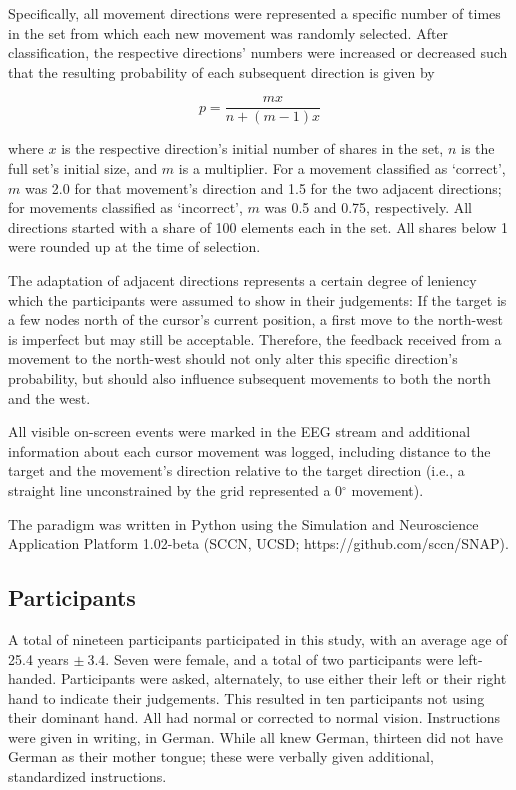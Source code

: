 Specifically, all movement directions were represented a specific number of times in the set from which each new movement was randomly selected. After classification, the respective directions' numbers were increased or decreased such that the resulting probability of each subsequent direction is given by

\begin{displaymath}
    p=\frac{mx}{n+(m-1)x}
\end{displaymath}

\noindent where $x$ is the respective direction's initial number of shares in the set, $n$ is the full set's initial size, and $m$ is a multiplier. For a movement classified as `correct', $m$ was 2.0 for that movement's direction and 1.5 for the two adjacent directions; for movements classified as `incorrect', $m$ was 0.5 and 0.75, respectively. All directions started with a share of 100 elements each in the set. All shares below 1 were rounded up at the time of selection.

The adaptation of adjacent directions represents a certain degree of leniency which the participants were assumed to show in their judgements: If the target is a few nodes north of the cursor's current position, a first move to the north-west is imperfect but may still be acceptable. Therefore, the feedback received from a movement to the north-west should not only alter this specific direction's probability, but should also influence subsequent movements to both the north and the west. 

All visible on-screen events were marked in the EEG stream and additional information about each cursor movement was logged, including distance to the target and the movement's direction relative to the target direction (i.e., a straight line unconstrained by the grid represented a 0$^\circ$ movement).

The paradigm was written in Python using the Simulation and Neuroscience Application Platform 1.02-beta (SCCN, UCSD; https://github.com/sccn/SNAP).


\subsection*{Participants}

A total of nineteen participants participated in this study, with an average age of 25.4 years $\pm~3.4$. Seven were female, and a total of two participants were left-handed. Participants were asked, alternately, to use either their left or their right hand to indicate their judgements. This resulted in ten participants not using their dominant hand. All had normal or corrected to normal vision. Instructions were given in writing, in German. While all knew German, thirteen did not have German as their mother tongue; these were verbally given additional, standardized instructions. 

